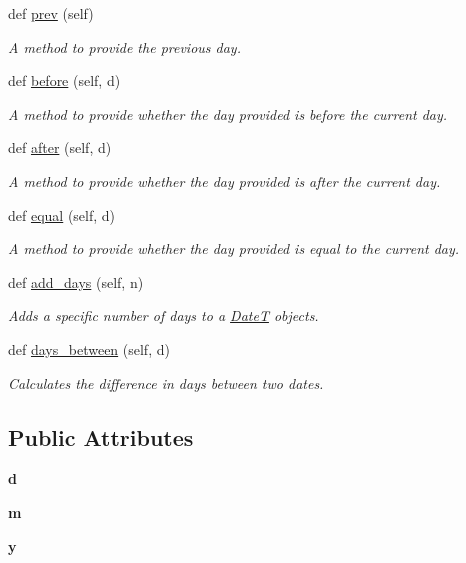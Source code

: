 \begin{DoxyCompactItemize}
def \hyperlink{classdate__adt_1_1_date_t_aaa4e6b382d483a0e263213ce68802f11}{prev} (self)
\begin{DoxyCompactList}\small\item\em A method to provide the previous day. \end{DoxyCompactList}\item 
def \hyperlink{classdate__adt_1_1_date_t_a9c7f4d560a968d5c5e811166eb1dcf55}{before} (self, d)
\begin{DoxyCompactList}\small\item\em A method to provide whether the day provided is before the current day. \end{DoxyCompactList}\item 
def \hyperlink{classdate__adt_1_1_date_t_a5e8f8b28cc78a795ce6a279dcbc9dbe1}{after} (self, d)
\begin{DoxyCompactList}\small\item\em A method to provide whether the day provided is after the current day. \end{DoxyCompactList}\item 
def \hyperlink{classdate__adt_1_1_date_t_acd9b4a721c3ef4629fa056a67af5d79d}{equal} (self, d)
\begin{DoxyCompactList}\small\item\em A method to provide whether the day provided is equal to the current day. \end{DoxyCompactList}\item 
def \hyperlink{classdate__adt_1_1_date_t_a623101fc17e1006ca1ac2db79b1b25cf}{add\+\_\+days} (self, n)
\begin{DoxyCompactList}\small\item\em Adds a specific number of days to a \hyperlink{classdate__adt_1_1_date_t}{DateT} objects. \end{DoxyCompactList}\item 
def \hyperlink{classdate__adt_1_1_date_t_a8592c63d42de5e67f5d0502117c4b4e0}{days\+\_\+between} (self, d)
\begin{DoxyCompactList}\small\item\em Calculates the difference in days between two dates. \end{DoxyCompactList}\end{DoxyCompactItemize}
\subsection*{Public Attributes}
\begin{DoxyCompactItemize}
\item 
\mbox{\label{classdate__adt_1_1_date_t_a55645f4a163d78206f78aea8c889ce0d}} 
{\bfseries d}
\item 
\mbox{\label{classdate__adt_1_1_date_t_a9623c910ae1d9ce2e2c93c6b5f343864}} 
{\bfseries m}
\item 
\mbox{\label{classdate__adt_1_1_date_t_a0dea3451e6c975b5afa2369a86d3107c}} 
{\bfseries y}
\end{DoxyCompactItemize}


